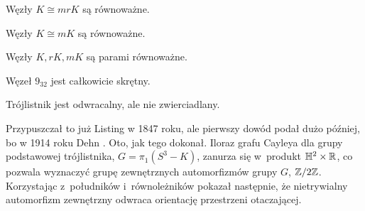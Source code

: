 \begin{definition}
    Węzły $K \cong mrK$ są równoważne. %
\end{definition}

\begin{definition}
    Węzły $K \cong mK$ są równoważne. %
\end{definition}

\begin{definition}
    Węzły $K, rK, mK$ są parami równoważne. %
\end{definition}

\begin{example}
    Węzeł $9_{32}$ jest całkowicie skrętny.
\end{example}


\begin{example}
    \label{exm:trefoil_is_chiral}
    Trójlistnik jest odwracalny, ale nie zwierciadlany.
\end{example}

Przypuszczał to już Listing \cite{listing1847} w 1847 roku, ale pierwszy dowód podał dużo później, bo w 1914 roku Dehn \cite{dehn14}. 
Oto, jak tego dokonał.
Iloraz grafu Cayleya dla grupy podstawowej trójlistnika, $G = \pi_1(S^3 - K)$, zanurza się w~produkt $\mathbb H^2 \times \mathbb R$, co pozwala wyznaczyć grupę zewnętrznych automorfizmów grupy $G$, $\mathbb Z/2\mathbb Z$.
Korzystając z~południków i~równoleżników pokazał następnie, że nietrywialny automorfizm zewnętrzny odwraca orientację przestrzeni otaczającej.

